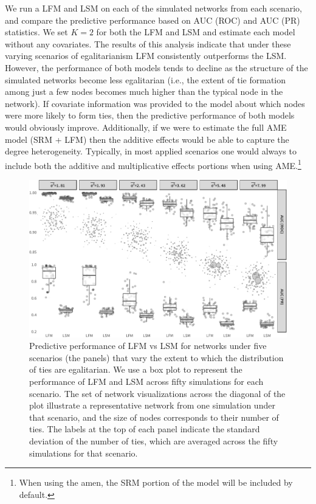 \documentclass[12pt,pdflatex]{elsarticle}
\newcommand{\pkg}[1]{{\fontseries{b}\selectfont #1}}
\begin{document}
We run a LFM and LSM on each of the simulated networks from each scenario, and compare the predictive performance based on AUC (ROC) and AUC (PR) statistics. We set $K=2$ for both the LFM and LSM and estimate each model without any covariates. The results of this analysis indicate that under these varying scenarios of egalitarianism LFM consistently outperforms the LSM. However, the performance of both models tends to decline as the structure of the simulated networks become less egalitarian (i.e., the extent of tie formation among just a few nodes becomes much higher than the typical node in the network). If covariate information was provided to the model about which nodes were more likely to form ties, then the predictive performance of both models would obviously improve. Additionally, if we were to estimate the full AME model (SRM + LFM) then the additive effects would be able to capture the degree heterogeneity. Typically, in most applied scenarios one would always to include both the additive and multiplicative effects portions when using AME.\footnote{When using the \pkg{amen}, the SRM portion of the model will be included by default.} 

\begin{figure}[ht]
	\centering
	\includegraphics[width=1\textwidth]{sim1Viz_nets.pdf}
	\caption{Predictive performance of LFM vs LSM for networks under five scenarios (the panels) that vary the extent to which the distribution of ties are egalitarian. We use a box plot to represent the performance of LFM and LSM across fifty simulations for each scenario. The set of network visualizations across the diagonal of the plot illustrate a representative network from one simulation under that scenario, and the size of nodes corresponds to their number of ties. The labels at the top of each panel indicate the standard deviation of the number of ties, which are averaged across the fifty simulations for that scenario.}
	\label{fig:sim_egal}	
\end{figure}
\end{document}
